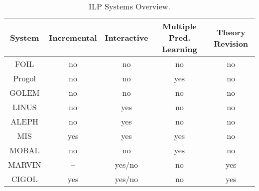 \begin{table}[t]
\begin{tabular}{|c|c|c|c|c|}
\hline
System & Incremental & Interactive & Multiple Pred. Learning & Theory Revision \\
\hline
FOIL & no & no & no & no \\
Progol & no & no & yes & no \\
GOLEM & no & no & no & no \\
LINUS & no & yes & no & no \\
ALEPH & no & yes & no & no \\
MIS & yes & yes & yes & no \\
MOBAL & no & no & yes & no \\
MARVIN & -- & yes/no & no & yes \\
CIGOL & yes & yes/no & no & yes \\
\hline
\end{tabular}
\caption{ILP Systems Overview.}
\label{tab:ilp}
\end{table}